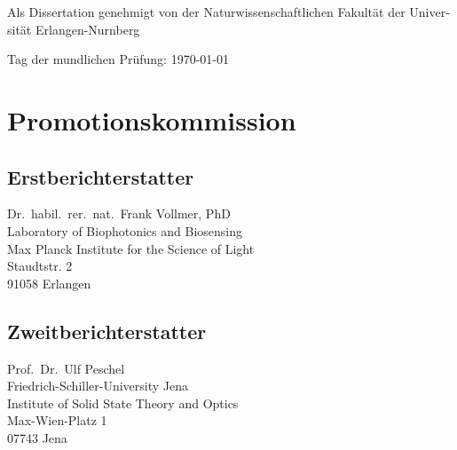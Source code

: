 \begin{otherlanguage}{german}
Als Dissertation genehmigt von der Naturwissenschaftlichen Fakultät der
Universität Erlangen-Nurnberg\\
\vspace{0.5cm}

Tag der mundlichen Prüfung: \today\\
\vspace{0.5cm}

\section*{Promotionskommission}
\subsection*{Erstberichterstatter}
Dr.~habil.~rer.~nat.~Frank Vollmer, PhD\\
Laboratory of Biophotonics and Biosensing\\
Max Planck Institute for the Science of Light\\
Staudtstr. 2\\
91058 Erlangen
\subsection*{Zweitberichterstatter}
Prof.~Dr.~Ulf Peschel\\
Friedrich-Schiller-University Jena\\
Institute of Solid State Theory and Optics\\
Max-Wien-Platz 1\\
07743 Jena
\end{otherlanguage}
